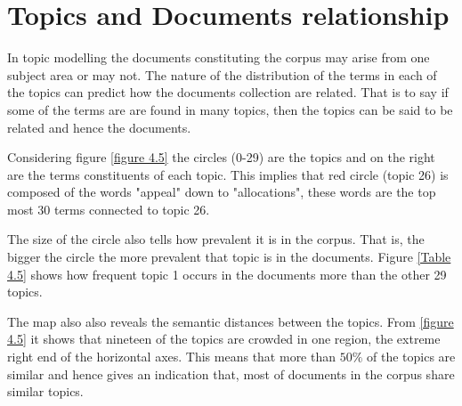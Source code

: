 \section{Topics and Documents relationship}
\begin{flushleft}
In topic modelling the documents constituting the corpus may arise from one subject area or may not. The nature of the distribution of the terms in each of the topics can predict how the documents collection are related. That is to say if some of the terms are are found in many topics, then the topics can be said to be  related and hence the documents. 
\end{flushleft}
\begin{flushleft}
Considering figure \eqref{figure 4.5} the circles (0-29) are the topics and on the right are the terms constituents of each topic. This implies that red circle (topic 26) is composed of the words "appeal" down to "allocations", these words are the top most 30 terms connected to topic 26.
\end{flushleft}
\begin{flushleft}
The size of the circle also tells how prevalent it is in the corpus. That is, the bigger the circle the more prevalent that topic is in the documents. Figure \eqref{Table 4.5} shows how frequent topic 1 occurs in the documents more than the other 29 topics.
\end{flushleft}
\begin{flushleft}
The map  also also reveals the semantic distances between the topics. From \eqref{figure 4.5} it shows that nineteen of the topics are crowded in one region, the extreme  right end of the horizontal axes. This means that more than $50\%$ of the topics are similar and hence gives an indication that, most of documents in the corpus share similar topics.
\end{flushleft}
